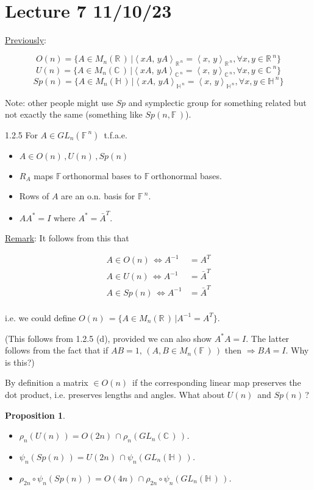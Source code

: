 \documentclass[12pt,a4paper]{article}
\newcommand{\rR}{\ensuremath{\mathbb{R}\,}}
\newcommand{\cC}{\ensuremath{\mathbb{C}\,}}
\newcommand{\hH}{\ensuremath{\mathbb{H}\,}}
\newcommand{\fF}{\ensuremath{\mathbb{F}\,}}
\newcommand{\mnr}{\ensuremath{M_n(\rR)\,}}
\newcommand{\mnc}{\ensuremath{M_n(\cC)\,}}
\newcommand{\mnh}{\ensuremath{M_n(\hH)\,}}
\newcommand{\mnf}{\ensuremath{M_n(\fF)\,}}
\newcommand{\glnc}{\ensuremath{GL_n(\cC)\,}}
\newcommand{\glnh}{\ensuremath{GL_n(\hH)\,}}
\newcommand{\glnf}{\ensuremath{GL_n(\fF^n)\,}}
\newcommand{\gon}{\ensuremath{O(n)\,}}
\newcommand{\gun}{\ensuremath{U(n)\,}}
\newcommand{\gspn}{\ensuremath{Sp(n)\,}}
\newcommand{\gok}[1]{\ensuremath{O(#1)\,}}
\newcommand{\guk}[1]{\ensuremath{U(#1)\,}}
\newcommand{\ra}{\ensuremath{\Rightarrow}}
\newcommand{\ipm}[2]{\ensuremath{\left\langle #1, \, #2 \right\rangle}}
\newcommand{\ul}[1]{\underline{#1}}
\newtheorem{prop}[thm]{Proposition}
\begin{document}
\section{Lecture 7 11/10/23}

\ul{Previously}:

\[O(n)=\{A\in \mnr | \ipm{xA}{yA}_{\rR^{n}}=\ipm{x}{y}_{\rR^{n}}, \forall x,y \in \rR^n\}\]
\[U(n)=\{A\in \mnc | \ipm{xA}{yA}_{\cC^{n}}=\ipm{x}{y}_{\cC^{n}}, \forall x,y \in \cC^n\}\]
\[Sp(n)=\{A\in \mnh | \ipm{xA}{yA}_{\hH^{n}}=\ipm{x}{y}_{\hH^{n}}, \forall x,y \in \hH^n\}\]

Note: other people might use $Sp$ and symplectic group for something related but not exactly the same (something like $Sp(n,\fF)$).

1.2.5 For $A \in \glnf$ t.f.a.e.

\begin{itemize}
\item[a)] $A\in \gon, \gun, \gspn$
\item[b)] $R_A$ maps \fF orthonormal bases to \fF orthonormal bases.
\item[c)] Rows of $A$ are an o.n. basis for $\fF^n$.
\item[d)] $AA^*=I$ where $A^*=\bar{A}^T$.
\end{itemize}

\ul{Remark}: It follows from this that

\begin{align*}
A\in \gon \iff A^{-1}&=A^T\\
A\in \gun \iff A^{-1}&=\bar{A}^T\\
A\in \gspn \iff A^{-1}&=\bar{A}^T\\
\end{align*}

i.e. we could define $\gon =\{A\in \mnr | A^{-1}=A^T\}$. 

(This follows from 1.2.5 (d), provided we can also show $A^*A=I$. The latter follows from the fact that if $AB=1$, $(A,B\in \mnf)$ then \ra $BA=I$. Why is this?)

By definition a matrix $\in \gon$ if the corresponding linear map preserves the dot product, i.e. preserves lengths and angles. What about $\gun$ and $\gspn$?

\begin{prop}
\phantom{a}\\
\begin{itemize}
\item[1)] $\rho_n(\gun)=\gok{2n}\cap \rho_n(\glnc)$.
\item[2)] $\psi_n(\gspn)=\guk{2n}\cap \psi_n(\glnh)$.
\item[3)] $\rho_{2n}\circ \psi_n(\gspn)=\gok{4n}\cap \rho_{2n}\circ\psi_n(\glnh)$.
\end{itemize}
\end{prop}
\end{document}
